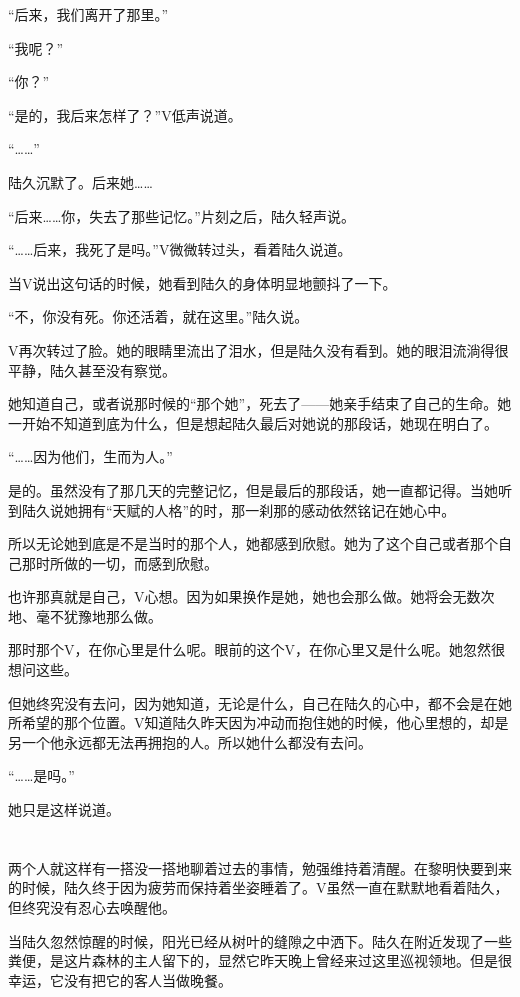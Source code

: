 “后来，我们离开了那里。”

“我呢？”

“你？”

“是的，我后来怎样了？”V低声说道。

“……”

陆久沉默了。后来她……

“后来……你，失去了那些记忆。”片刻之后，陆久轻声说。

“……后来，我死了是吗。”V微微转过头，看着陆久说道。

当V说出这句话的时候，她看到陆久的身体明显地颤抖了一下。

“不，你没有死。你还活着，就在这里。”陆久说。

V再次转过了脸。她的眼睛里流出了泪水，但是陆久没有看到。她的眼泪流淌得很平静，陆久甚至没有察觉。

她知道自己，或者说那时候的“那个她”，死去了——她亲手结束了自己的生命。她一开始不知道到底为什么，但是想起陆久最后对她说的那段话，她现在明白了。

“……因为他们，生而为人。”

是的。虽然没有了那几天的完整记忆，但是最后的那段话，她一直都记得。当她听到陆久说她拥有“天赋的人格”的时，那一刹那的感动依然铭记在她心中。

所以无论她到底是不是当时的那个人，她都感到欣慰。她为了这个自己或者那个自己那时所做的一切，而感到欣慰。

也许那真就是自己，V心想。因为如果换作是她，她也会那么做。她将会无数次地、毫不犹豫地那么做。

那时那个V，在你心里是什么呢。眼前的这个V，在你心里又是什么呢。她忽然很想问这些。

但她终究没有去问，因为她知道，无论是什么，自己在陆久的心中，都不会是在她所希望的那个位置。V知道陆久昨天因为冲动而抱住她的时候，他心里想的，却是另一个他永远都无法再拥抱的人。所以她什么都没有去问。

“……是吗。”

她只是这样说道。

\section*{}

两个人就这样有一搭没一搭地聊着过去的事情，勉强维持着清醒。在黎明快要到来的时候，陆久终于因为疲劳而保持着坐姿睡着了。V虽然一直在默默地看着陆久，但终究没有忍心去唤醒他。

当陆久忽然惊醒的时候，阳光已经从树叶的缝隙之中洒下。陆久在附近发现了一些粪便，是这片森林的主人留下的，显然它昨天晚上曾经来过这里巡视领地。但是很幸运，它没有把它的客人当做晚餐。

